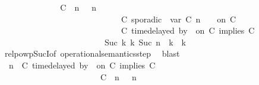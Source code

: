 \begin{isabellebody}
\ \ \ \ \ \ \ \ \ \ \isamarkupfalse%
\ \isamarkupfalse%
\ {\isacartoucheopen}{\isacharparenleft}\ {\isacharparenleft}{\isacharparenleft}C\ {\isasymUp}\ n{\isacharparenright}\ {\isacharhash}\ {\isasymGamma}{\isacharparenright}{\isacharcomma}\ n\isanewline
\ \ \ \ \ \ \ \ \ \ \ \ \ \ \ \ \ \ \ \ \ \ \ \ \ \ \ \ {\isasymturnstile}\ {\isacharparenleft}C\ sporadic{\isasymsharp}\ {\isasymlparr}\ {\isasymtau}\isactrlsub v\isactrlsub a\isactrlsub r\ {\isacharparenleft}C\ n{\isacharparenright}\ {\isasymoplus}\ {\isasymdelta}{\isasymtau}\ {\isasymrparr}\ on\ C\ {\isacharhash}\ {\isasymPsi}\isanewline
\ \ \ \ \ \ \ \ \ \ \ \ \ \ \ \ \ \ \ \ \ \ \ \ \ \ \ \ {\isasymtriangleright}\ {\isacharparenleft}{\isacharparenleft}C\ time{\isacharminus}delayed{\isasymbowtie}\ by\ {\isasymdelta}{\isasymtau}\ on\ C\ implies\ C\ {\isacharhash}\ {\isasymPhi}{\isacharparenright}{\isacharparenright}\isanewline
\ \ \ \ \ \ \ \ \ \ \ \ \ \ \ \ \ \ \ \ \ \ \ \ \ {\isasymhookrightarrow}\isactrlbsup Suc\ k\isactrlesup \ {\isacharparenleft}{\isasymGamma}\isactrlsub k{\isacharcomma}\ Suc\ n\ {\isasymturnstile}\ {\isasymPsi}\isactrlsub k\ {\isasymtriangleright}\ {\isasymPhi}\isactrlsub k{\isacharparenright}{\isacartoucheclose}\isanewline
\ \ \ \ \ \ \ \ \ \ \ \ \isamarkupfalse%
\ relpowp{\isacharunderscore}Suc{\isacharunderscore}I{}{\isacharbrackleft}of\ {\isacartoucheopen}operational{\isacharunderscore}semantics{\isacharunderscore}step{\isacartoucheclose}{\isacharbrackright}\ \isamarkupfalse%
\ blast\ \isanewline
\ \ \ \ \ \ \ \ \ \ \isamarkupfalse%
\ \isamarkupfalse%
\ {\isacartoucheopen}{\isacharparenleft}{\isasymGamma}{\isacharcomma}\ n\ {\isasymturnstile}\ {\isacharparenleft}{\isacharparenleft}C\ time{\isacharminus}delayed{\isasymbowtie}\ by\ {\isasymdelta}{\isasymtau}\ on\ C\ implies\ C\ {\isacharhash}\ {\isasymPsi}{\isacharparenright}\ {\isasymtriangleright}\ {\isasymPhi}{\isacharparenright}\isanewline
\ \ \ \ \ \ \ \ \ \ \ \ \ \ \ \ \ \ \ \ \ \ {\isasymhookrightarrow}\ {\isacharparenleft}\ {\isacharparenleft}{\isacharparenleft}C\ {\isasymUp}\ n{\isacharparenright}\ {\isacharhash}\ {\isasymGamma}{\isacharparenright}{\isacharcomma}\ n\isanewline

\end{isabellebody}
